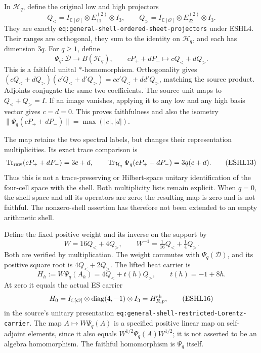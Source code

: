 \documentclass[
  10pt,
  a4paper,
]{article}
\begin{document}
In \(\mathcal H_q\), define the original low and high projectors \[
Q_<=I_{\mathbb C[\mathcal O]}\otimes E_{11}^{(2)}\otimes I_3,
\qquad Q_>=I_{\mathbb C[\mathcal O]}\otimes E_{22}^{(2)}\otimes I_3.
\tag{ESHL11}
\] They are exactly \texttt{eq:\allowbreak{}general-\allowbreak{}shell-\allowbreak{}ordered-\allowbreak{}sheet-\allowbreak{}projectors}
under ESHL4. Their ranges are orthogonal, they sum to the identity on
\(\mathcal H_q\), and each has dimension \(3q\). For \(q\ge1\), define
\[
\boxed{\Psi_q:\mathcal D\longrightarrow B(\mathcal H_q),
\qquad cP_++dP_-\longmapsto cQ_<+dQ_>.}
\tag{ESHL12}
\] This is a faithful unital \(*\)-homomorphism. Orthogonality gives
\((cQ_<+dQ_>)(c'Q_<+d'Q_>)=cc'Q_<+dd'Q_>\), matching the source product.
Adjoints conjugate the same two coefficients. The source unit maps to
\(Q_<+Q_>=I\). If an image vanishes, applying it to any low and any high
basis vector gives \(c=d=0\). This proves faithfulness and also the
isometry \(\|\Psi_q(cP_++dP_-)\|=\max(|c|,|d|)\).

The map retains the two spectral labels, but changes their
representation multiplicities. Its exact trace comparison is \[
\operatorname{Tr}_{\rm raw}(cP_++dP_-)=3c+d,
\qquad \operatorname{Tr}_{\mathcal H_q}\Psi_q(cP_++dP_-)=3q(c+d).
\tag{ESHL13}
\] Thus this is not a trace-preserving or Hilbert-space unitary
identification of the four-cell space with the shell. Both multiplicity
lists remain explicit. When \(q=0\), the shell space and all its
operators are zero; the resulting map is zero and is not faithful. The
nonzero-shell assertion has therefore not been extended to an empty
arithmetic shell.

Define the fixed positive weight and its inverse on the support by \[
W=16Q_<+4Q_>,\qquad W^{-1}=\tfrac1{16}Q_<+\tfrac14Q_>.
\tag{ESHL14}
\] Both are verified by multiplication. The weight commutes with
\(\Psi_q(\mathcal D)\), and its positive square root is \(4Q_<+2Q_>\).
The lifted heat carrier is \[
\boxed{H_h:=W\Psi_q(A_h)=4Q_<+t(h)Q_>,
\qquad t(h)=-1+8h.}
\tag{ESHL15}
\] At zero it equals the actual ES carrier \[
H_0=I_{\mathbb C[\mathcal O]}\otimes\operatorname{diag}(4,-1)\otimes I_3
=H^{\rm sh}_{R,p},
\tag{ESHL16}
\] in the source's unitary presentation
\texttt{eq:\allowbreak{}general-\allowbreak{}shell-\allowbreak{}restricted-\allowbreak{}Lorentz-\allowbreak{}carrier}. The map
\(A\mapsto W\Psi_q(A)\) is a specified positive linear map on
self-adjoint elements, since it also equals \(W^{1/2}\Psi_q(A)W^{1/2}\);
it is not asserted to be an algebra homomorphism. The faithful
homomorphism is \(\Psi_q\) itself.
\end{document}
